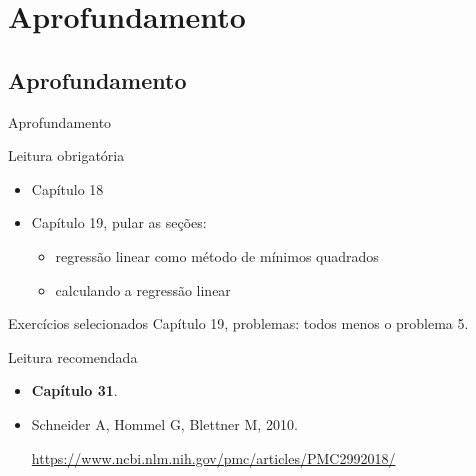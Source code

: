 \documentclass{beamer}
\begin{document}
\section{Aprofundamento}

\subsection{Aprofundamento}

\begin{frame}{Aprofundamento}
  \begin{block}{Leitura obrigatória}
    \begin{itemize}
      \footnotesize
    \item Capítulo 18
    \item Capítulo 19, pular as seções:
      \begin{itemize}
        \scriptsize
      \item regressão linear como método de mínimos quadrados
      \item calculando a regressão linear
      \end{itemize}
    \end{itemize}
  \end{block}
  \begin{block}{Exercícios selecionados}
    \footnotesize
    Capítulo 19, problemas: todos menos o problema 5.
  \end{block}
  \begin{block}{Leitura recomendada}
    \small
    
    \begin{itemize}
    \item {\bf Capítulo 31}.
      \scriptsize
    \item Schneider A, Hommel G, Blettner M, 2010.

      \url{https://www.ncbi.nlm.nih.gov/pmc/articles/PMC2992018/}

    \end{itemize}
  \end{block}
\end{frame}
\end{document}
